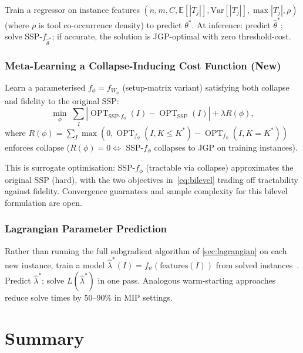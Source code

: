 \documentclass[11pt,a4paper]{article}
\theoremstyle{plain}
\theoremstyle{definition}
\DeclareMathOperator{\OPT}{OPT}
\newcommand{\Kstar}{K^{*}}
\begin{document}
Train a regressor on instance features
$(n,m,C,\mathbb{E}[|T_j|],\mathrm{Var}[|T_j|],\max|T_j|,\rho)$
(where $\rho$ is tool co-occurrence density) to predict $\theta^*$.
At inference: predict $\hat\theta^*$; solve SSP-$f_{\hat\theta^*}$;
if accurate, the solution is JGP-optimal with zero threshold-cost.

\subsubsection{Meta-Learning a Collapse-Inducing Cost Function (New)}
\label{sec:metalearning}

Learn a parameterised $f_\phi=f_{W_\phi}$ (setup-matrix variant) satisfying
both collapse and fidelity to the original SSP:
\begin{equation}
  \label{eq:bilevel}
  \min_\phi\;\sum_I|\OPT_{\mathrm{SSP}\text{-}f_\phi}(I)-\OPT_{\mathrm{SSP}}(I)|
  +\lambda R(\phi),
\end{equation}
where
$R(\phi)=\sum_I\max(0,\OPT_{f_\phi}(I,K\le\Kstar)-\OPT_{f_\phi}(I,K=\Kstar))$
enforces collapse ($R(\phi)=0\iff$ SSP-$f_\phi$ collapses to JGP on training instances).

This is surrogate optimisation: SSP-$f_\phi$ (tractable via collapse) approximates
the original SSP (hard), with the two objectives in~\eqref{eq:bilevel} trading
off tractability against fidelity. Convergence guarantees and sample complexity
for this bilevel formulation are open.

\subsubsection{Lagrangian Parameter Prediction}

Rather than running the full subgradient algorithm of \cref{sec:lagrangian} on each
new instance, train a model $\hat\lambda^*(I)=f_\psi(\mathrm{features}(I))$ from
solved instances~\cite{Khalil2016}.
Predict $\hat\lambda^*$; solve $L(\hat\lambda^*)$ in one pass.
Analogous warm-starting approaches reduce solve times by 50--90\% in MIP settings.

\section{Summary}
\label{sec:summary}
\end{document}
